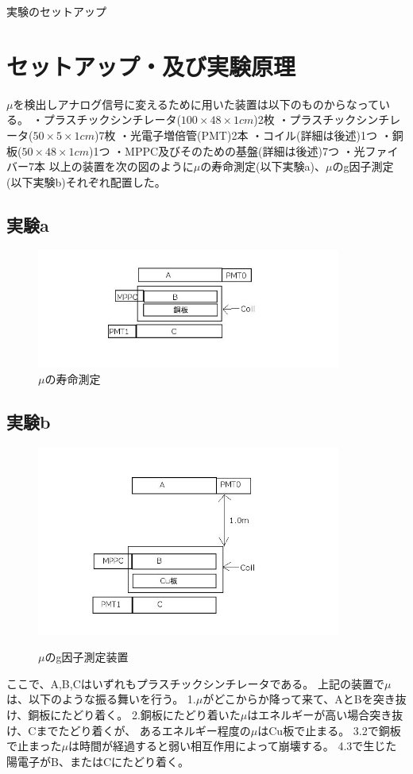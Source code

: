 実験のセットアップ
\section{セットアップ・及び実験原理}
$\mu$を検出しアナログ信号に変えるために用いた装置は以下のものからなっている。
・プラスチックシンチレータ($100\times 48\times 1cm$)2枚
・プラスチックシンチレータ($50\times 5\times 1cm$)7枚
・光電子増倍管(PMT)2本
・コイル(詳細は後述)1つ
・銅板($50\times 48\times 1cm$)1つ
・MPPC及びそのための基盤(詳細は後述)7つ
・光ファイバー7本
以上の装置を次の図のように$\mu$の寿命測定(以下実験a)、$\mu$のg因子測定(以下実験b)それぞれ配置した。
\subsection{実験a}
\begin{figure}[h]
  \includegraphics[width=10cm]{zikken_a.jpg}
  \caption{$\mu$の寿命測定}
\end{figure}
\subsection{実験b}
\begin{figure}[h]
  \includegraphics[width=10cm]{zikken_b.jpg}
　\caption{$\mu$のg因子測定装置}
\end{figure}
ここで、A,B,Cはいずれもプラスチックシンチレータである。
上記の装置で$\mu$は、以下のような振る舞いを行う。
1.$\mu$がどこからか降って来て、AとBを突き抜け、銅板にたどり着く。
2.銅板にたどり着いた$\mu$はエネルギーが高い場合突き抜け、Cまでたどり着くが、
あるエネルギー程度の$\mu$はCu板で止まる。
3.2で銅板で止まった$\mu$は時間が経過すると弱い相互作用によって崩壊する。
4.3で生じた陽電子がB、またはCにたどり着く。


